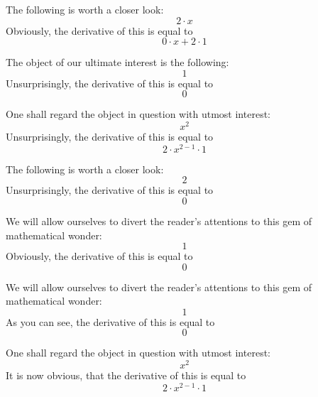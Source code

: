 \documentclass{article}
\begin{document}
The following is worth a closer look:
\begin{equation}
2 \cdot x 
\end{equation}
Obviously, the derivative of this is equal to
\begin{equation}
0 \cdot x + 2 \cdot 1 
\end{equation}

The object of our ultimate interest is the following:
\begin{equation}
1 
\end{equation}
Unsurprisingly, the derivative of this is equal to
\begin{equation}
0 
\end{equation}

One shall regard the object in question with utmost interest:
\begin{equation}
x ^{2 } 
\end{equation}
Unsurprisingly, the derivative of this is equal to
\begin{equation}
2 \cdot x ^{2 - 1 } \cdot 1 
\end{equation}

The following is worth a closer look:
\begin{equation}
2 
\end{equation}
Unsurprisingly, the derivative of this is equal to
\begin{equation}
0 
\end{equation}

We will allow ourselves to divert the reader's attentions to this gem of mathematical wonder:
\begin{equation}
1 
\end{equation}
Obviously, the derivative of this is equal to
\begin{equation}
0 
\end{equation}

We will allow ourselves to divert the reader's attentions to this gem of mathematical wonder:
\begin{equation}
1 
\end{equation}
As you can see, the derivative of this is equal to
\begin{equation}
0 
\end{equation}

One shall regard the object in question with utmost interest:
\begin{equation}
x ^{2 } 
\end{equation}
It is now obvious, that the derivative of this is equal to
\begin{equation}
2 \cdot x ^{2 - 1 } \cdot 1 
\end{equation}
\end{document}
